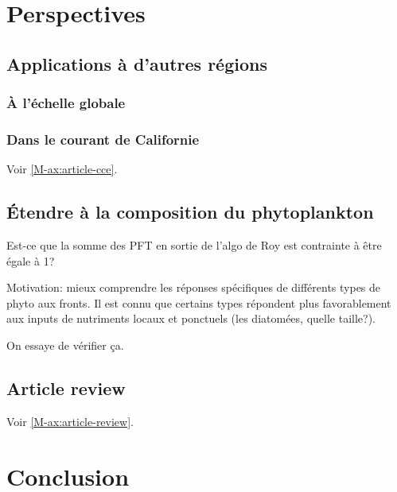 \documentclass[index]{subfiles}
\begin{document}
\chapter{Perspectives}
\label{chp:perspectives}

\tocsubfile%

\section{Applications à d'autres régions}
\label{sec:appl-autres-regions}

\subsection{À l'échelle globale}
\label{sec:global}

\subsection{Dans le courant de Californie}
\label{sec:CCE}

Voir \cref{M-ax:article-cce}.

\section{Étendre à la composition du phytoplankton}
\label{sec:persp-pft}

Est-ce que la somme des PFT en sortie de l'algo de Roy est contrainte à être égale à 1?

Motivation: mieux comprendre les réponses spécifiques de différents types de phyto aux fronts.
Il est connu que certains types répondent plus favorablement aux inputs de nutriments locaux et ponctuels (les diatomées, quelle taille?).

On essaye de vérifier ça.

\section{Article review}
Voir \cref{M-ax:article-review}.

\chapter{Conclusion}
\label{chp:conclusion}
\end{document}
